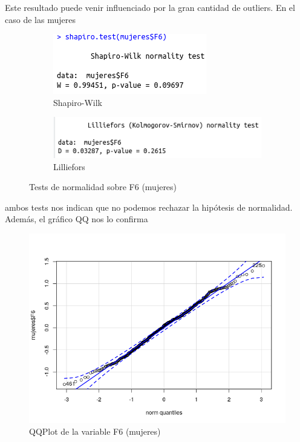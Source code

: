 Este resultado puede venir influenciado por la gran cantidad de outliers. En el caso de las mujeres

\begin{figure}[H]
	\centering
	\begin{subfigure}{.5\textwidth}
		\centering
		\includegraphics[width=.6\linewidth]{swm-F6.png}
		\caption{Shapiro-Wilk}
		\label{fig:swm-F6}
	\end{subfigure}%
	\begin{subfigure}{.5\textwidth}
		\centering
		\includegraphics[width=.6\linewidth]{lm-F6.png}
		\caption{Lilliefors}
		\label{fig:lm-F6}
	\end{subfigure}
	\caption{Tests de normalidad sobre F6 (mujeres)}
	\label{fig:normmF6}
\end{figure}

ambos tests nos indican que no podemos rechazar la hipótesis de normalidad. Además, el gráfico QQ nos lo confirma

\begin{figure}[H] %
	\centering
	\includegraphics[scale=0.6]{qq-F6m.png}  %
	\caption{QQPlot de la variable F6 (mujeres)} 
	\label{fig:qq-F6m}
\end{figure}

